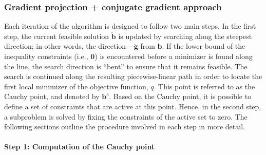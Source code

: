 \documentclass[11pt]{article}
\newcommand{\0}{\phantom{0}}
\begin{document}
\subsubsection*{Gradient projection + conjugate gradient approach}

Each iteration of the algorithm is designed to follow two main steps. In the first step, the current feasible solution $\ddot{\bm{b}}$ is updated by searching along the steepest direction; in other words, the direction $-\ddot{\bm{g}}$ from $\ddot{\bm{b}}$. If the lower bound of the inequality constraints (i.e., $\bm{0}$) is encountered before a minimizer is found along the line, the search direction is ``bent'' to ensure that it remains feasible. The search is continued along the resulting piecewise-linear path in order to locate the first local minimizer of the objective function, $q$. This point is referred to as the Cauchy point, and denoted by $\bm{b}^{c}$. Based on the Cauchy point, it is possible to define a set of constraints that are active at this point. Hence, in the second step, a subproblem is solved by fixing the constraints of the active set to zero. The following sections outline the procedure involved in each step in more detail.

\paragraph{Step 1: Computation of the Cauchy point}
\end{document}
